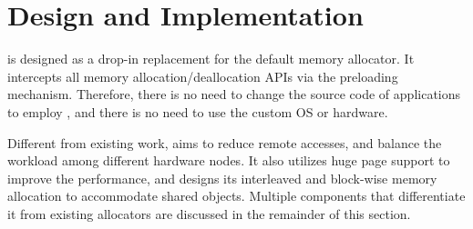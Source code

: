 \section{Design and Implementation}
\label{sec:implement}

\NM{} is designed as a drop-in replacement for the default memory allocator. It intercepts all memory allocation/deallocation APIs via the preloading mechanism. Therefore, there is no need to change the source code of applications to employ \NM{}, and there is no need to use the custom OS or hardware. 

Different from existing work, \NA{} aims to reduce remote accesses, and balance the workload among different hardware nodes. It also utilizes huge page support to improve the performance, and designs its interleaved and block-wise memory allocation to accommodate shared objects. Multiple components that differentiate it from existing allocators are discussed in the remainder of this section. 
  

